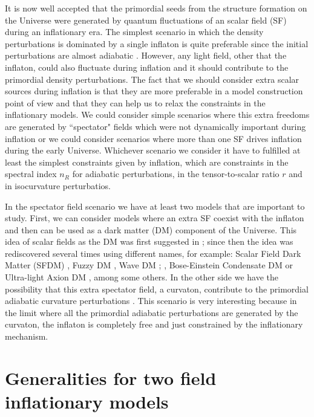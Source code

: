 \documentclass[amssymb,twocolumn,prd,nofootinbib,showpacs]{revtex4-1}
\begin{document}
It is now well accepted that the primordial seeds from the structure formation on the Universe were generated by quantum fluctuations of an scalar field (SF) during an inflationary era. The simplest scenario in which the density perturbations is dominated by a single inflaton is quite preferable since the initial perturbations are almost adiabatic \cite{const1,const2,planck}. However, any light field, other that the inflaton, could also fluctuate during inflation and it should contribute to the primordial density perturbations. The fact that we should consider extra scalar sources during inflation is that they are more preferable in a model construction point of view and that they can help us to relax the constraints in the inflationary models. We could consider simple scenarios where this extra freedoms are generated by ``spectator" fields which were not dynamically important during inflation or we could consider scenarios where more than one SF drives inflation during the early Universe. Whichever scenario we consider it have to fulfilled at least the simplest constraints given by inflation, which are constraints in the spectral index $n_R$ for adiabatic perturbations, in the tensor-to-scalar ratio $r$ and in isocurvature perturbatios. 

In the spectator field scenario we have at least two models that are important to study. First, we can consider models where an extra SF coexist with the inflaton and then can be used as a dark matter (DM) component of the Universe. This idea of scalar fields as the DM was first suggested in \cite{SF1}; since then the idea was rediscovered several times using different names, for example: Scalar Field Dark
Matter  (SFDM)  \cite{SF2},  Fuzzy  DM  \cite{SF3}, Wave DM \cite{SF4}; \cite{SF5}, Bose-Einstein
Condensate DM \cite{SF6} or Ultra-light Axion DM
\cite{SF7,SF8}, among some others. In the other side we have the possibility that this extra spectator field, a curvaton, contribute to the primordial adiabatic curvature perturbations \cite{curv1,curv2,curv3}. This scenario is very interesting because in the limit where all the primordial adiabatic perturbations are generated by the curvaton, the inflaton is completely free and just constrained by the inflationary mechanism.

\section{Generalities for two field inflationary models}\label{Generalities}
\end{document}
